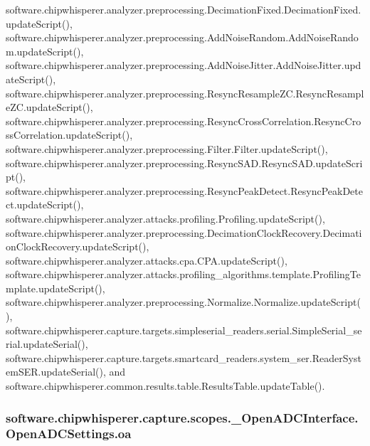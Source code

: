 software.\+chipwhisperer.\+analyzer.\+preprocessing.\+Decimation\+Fixed.\+Decimation\+Fixed.\+update\+Script(), software.\+chipwhisperer.\+analyzer.\+preprocessing.\+Add\+Noise\+Random.\+Add\+Noise\+Random.\+update\+Script(), software.\+chipwhisperer.\+analyzer.\+preprocessing.\+Add\+Noise\+Jitter.\+Add\+Noise\+Jitter.\+update\+Script(), software.\+chipwhisperer.\+analyzer.\+preprocessing.\+Resync\+Resample\+Z\+C.\+Resync\+Resample\+Z\+C.\+update\+Script(), software.\+chipwhisperer.\+analyzer.\+preprocessing.\+Resync\+Cross\+Correlation.\+Resync\+Cross\+Correlation.\+update\+Script(), software.\+chipwhisperer.\+analyzer.\+preprocessing.\+Filter.\+Filter.\+update\+Script(), software.\+chipwhisperer.\+analyzer.\+preprocessing.\+Resync\+S\+A\+D.\+Resync\+S\+A\+D.\+update\+Script(), software.\+chipwhisperer.\+analyzer.\+preprocessing.\+Resync\+Peak\+Detect.\+Resync\+Peak\+Detect.\+update\+Script(), software.\+chipwhisperer.\+analyzer.\+attacks.\+profiling.\+Profiling.\+update\+Script(), software.\+chipwhisperer.\+analyzer.\+preprocessing.\+Decimation\+Clock\+Recovery.\+Decimation\+Clock\+Recovery.\+update\+Script(), software.\+chipwhisperer.\+analyzer.\+attacks.\+cpa.\+C\+P\+A.\+update\+Script(), software.\+chipwhisperer.\+analyzer.\+attacks.\+profiling\+\_\+algorithms.\+template.\+Profiling\+Template.\+update\+Script(), software.\+chipwhisperer.\+analyzer.\+preprocessing.\+Normalize.\+Normalize.\+update\+Script(), software.\+chipwhisperer.\+capture.\+targets.\+simpleserial\+\_\+readers.\+serial.\+Simple\+Serial\+\_\+serial.\+update\+Serial(), software.\+chipwhisperer.\+capture.\+targets.\+smartcard\+\_\+readers.\+system\+\_\+ser.\+Reader\+System\+S\+E\+R.\+update\+Serial(), and software.\+chipwhisperer.\+common.\+results.\+table.\+Results\+Table.\+update\+Table().

\hypertarget{classsoftware_1_1chipwhisperer_1_1capture_1_1scopes_1_1__OpenADCInterface_1_1OpenADCSettings_a06eb59a07e807ab92554738c4922f1e5}{}
\subsubsection[{oa}]{\setlength{\rightskip}{0pt plus 5cm}software.\+chipwhisperer.\+capture.\+scopes.\+\_\+\+Open\+A\+D\+C\+Interface.\+Open\+A\+D\+C\+Settings.\+oa}\label{classsoftware_1_1chipwhisperer_1_1capture_1_1scopes_1_1__OpenADCInterface_1_1OpenADCSettings_a06eb59a07e807ab92554738c4922f1e5}


